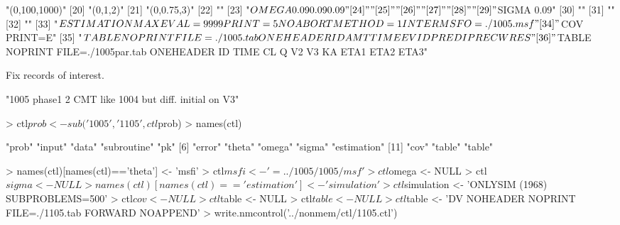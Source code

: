 \begin{Schunk}
\begin{Soutput}
[19] "(0,100,1000)"                                                                                
[20] "(0,1,2)"                                                                                     
[21] "(0,0.75,3)"                                                                                  
[22] ""                                                                                            
[23] "$OMEGA 0.09 0.09 0.09 "                                                                      
[24] ""                                                                                            
[25] ""                                                                                            
[26] ""                                                                                            
[27] ""                                                                                            
[28] ""                                                                                            
[29] "$SIGMA 0.09"                                                                                 
[30] ""                                                                                            
[31] ""                                                                                            
[32] ""                                                                                            
[33] "$ESTIMATION MAXEVAL=9999 PRINT=5 NOABORT METHOD=1 INTER MSFO=./1005.msf"                     
[34] "$COV PRINT=E"                                                                                
[35] "$TABLE NOPRINT FILE=./1005.tab ONEHEADER ID AMT TIME EVID PRED IPRE CWRES"                   
[36] "$TABLE NOPRINT FILE=./1005par.tab ONEHEADER ID TIME CL Q V2 V3 KA ETA1 ETA2 ETA3"            
\end{Soutput}
\end{Schunk}
Fix records of interest.
\begin{Schunk}
\begin{Soutput}
[1] "1005 phase1 2 CMT like 1004 but diff. initial on V3"
\end{Soutput}
\begin{Sinput}
> ctl$prob <- sub('1005','1105',ctl$prob)
> names(ctl)
\end{Sinput}
\begin{Soutput}
 [1] "prob"       "input"      "data"       "subroutine" "pk"        
 [6] "error"      "theta"      "omega"      "sigma"      "estimation"
[11] "cov"        "table"      "table"     
\end{Soutput}
\begin{Sinput}
> names(ctl)[names(ctl)=='theta'] <- 'msfi'
> ctl$msfi <- '=../1005/1005/msf'
> ctl$omega <- NULL
> ctl$sigma <- NULL
> names(ctl)[names(ctl)=='estimation'] <- 'simulation'
> ctl$simulation <- 'ONLYSIM (1968) SUBPROBLEMS=500'
> ctl$cov <- NULL
> ctl$table <- NULL
> ctl$table <- NULL
> ctl$table <- 'DV NOHEADER NOPRINT FILE=./1105.tab FORWARD NOAPPEND'
> write.nmcontrol('../nonmem/ctl/1105.ctl')
\end{Sinput}
\end{Schunk}
